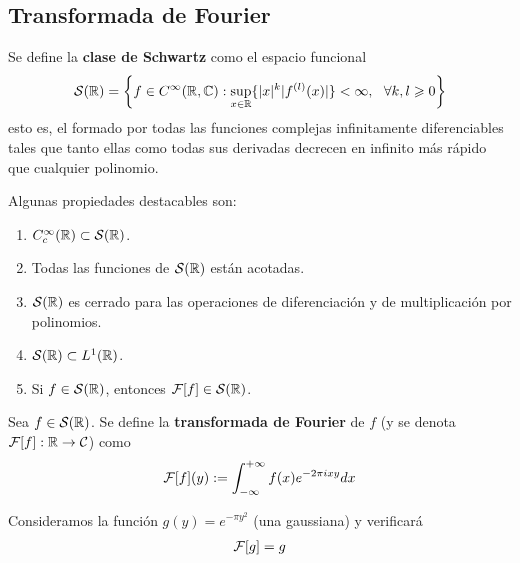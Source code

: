 \documentclass[12pt]{book}
\begin{document}
    \subsection{Transformada de Fourier}
    \begin{definicion} Se define la \textbf{clase de Schwartz} como el espacio funcional 
        \begin{gather*}
            \mathcal{S}(\mathbb{R}) = \left\{ f\in C^\infty(\mathbb{R}, \mathbb{C}) : \sup_{x\in \mathbb{R}}\{|x|^k|f^{(l)}(x)|\} < \infty,\ \ \forall k,l\geqslant 0 \right\}
        \end{gather*}
        esto es, el formado por todas las funciones complejas infinitamente diferenciables tales que tanto ellas como todas sus derivadas decrecen en infinito más rápido que cualquier polinomio.
    \end{definicion}

    \begin{propiedades}
        Algunas propiedades destacables son:
        \begin{enumerate}
            \item $C_c^\infty(\mathbb{R}) \subset \mathcal{S}(\mathbb{R})$.
            \item Todas las funciones de $\mathcal{S}(\mathbb{R})$ están acotadas.
            \item $\mathcal{S}(\mathbb{R})$ es cerrado para las operaciones de diferenciación y de multiplicación por polinomios.
            \item $\mathcal{S}(\mathbb{R}) \subset L^1(\mathbb{R})$.
            \item Si $f\in \mathcal{S}(\mathbb{R})$, entonces $\mathcal{F}[f]\in \mathcal{S}(\mathbb{R})$.
        \end{enumerate}
    \end{propiedades}

    \begin{definicion} Sea $f\in \mathcal{S}(\mathbb{R})$. Se define la \textbf{transformada de Fourier} de $f$ (y se denota $\mathcal{F}[f] : \mathbb{R} \to \mathcal{C}$) como 
        \begin{gather*}
            \mathcal{F}[f](y) := \int_{-\infty}^{+\infty} f(x) e^{-2\pi i xy} dx
        \end{gather*}
    \end{definicion}

    \begin{observacion}
        Consideramos la función $g(y)= e^{-\pi y^2}$ (una gaussiana) y verificará
        \begin{gather*}
            \mathcal{F}[g] = g
        \end{gather*}
        
    \end{observacion}
\end{document}
